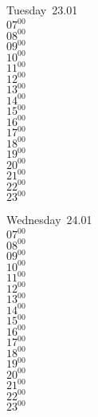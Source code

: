 \documentclass[11pt, a4paper]{book}\usepackage[]{graphicx}\usepackage[]{color}
\begin{document}
\begin{weekdaybox}
  Tuesday~23.01\\
  { 
  \vfill
  $07^{00}$\\
$08^{00}$\\
$09^{00}$\\
$10^{00}$\\
$11^{00}$\\
$12^{00}$\\
$13^{00}$\\
$14^{00}$\\
$15^{00}$\\
$16^{00}$\\
$17^{00}$\\
$18^{00}$\\
$19^{00}$\\
$20^{00}$\\
$21^{00}$\\
$22^{00}$\\
$23^{00}$\\
  }
\end{weekdaybox}
\begin{weekdaybox}
  Wednesday~24.01\\
  { 
  \vfill
  $07^{00}$\\
$08^{00}$\\
$09^{00}$\\
$10^{00}$\\
$11^{00}$\\
$12^{00}$\\
$13^{00}$\\
$14^{00}$\\
$15^{00}$\\
$16^{00}$\\
$17^{00}$\\
$18^{00}$\\
$19^{00}$\\
$20^{00}$\\
$21^{00}$\\
$22^{00}$\\
$23^{00}$\\
  }
\end{weekdaybox}
\clearpage
\begin{headerbox}
\end{headerbox}
\end{document}
